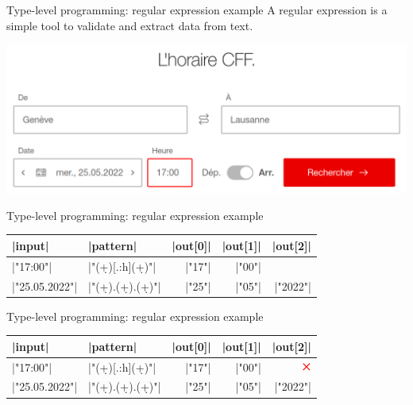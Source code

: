 \documentclass[10pt]{beamer}
\newenvironment{slide}[2][]
  {\begin{frame}[fragile,environment=slide,#1]{#2}}
  {\end{frame}}
\def\cross{$\mathbin{\tikz [x=1.4ex,y=1.4ex,line width=.2ex, red] \draw (0,0) -- (1,1) (0,1) -- (1,0);}$}
\begin{document}
\begin{slide}{Type-level programming: regular expression example}
\Large
A regular expression is a simple tool to validate and extract data from text.
\vspace{10pt}

\includegraphics[width=\textwidth]{figures/cff.png}
\end{slide}

\begin{slide}{Type-level programming: regular expression example}
\begin{center}
\renewcommand{\arraystretch}{1.2}
\begin{tabular}{@{}llrrr@{}}
\toprule
|input| & |pattern| & |out[0]| & |out[1]| & |out[2]| \\
\midrule
|"17:00"| & |"(\d+)[.:h](\d+)"| & |"17"| & |"00"|  & \\
\pause
|"25.05.2022"| & |"(\d+).(\d+).(\d+)"| & |"25"| & |"05"| & |"2022"| \\
\bottomrule
\end{tabular}

\end{center}
\end{slide}

\begin{slide}{Type-level programming: regular expression example}
\begin{center}
\renewcommand{\arraystretch}{1.2}
\begin{tabular}{@{}llrrr@{}}
\toprule
|input| & |pattern| & |out[0]| & |out[1]| & |out[2]| \\
\midrule
|"17:00"| & |"(\d+)[.:h](\d+)"| & |"17"| & |"00"|  & \cross \\
|"25.05.2022"| & |"(\d+).(\d+).(\d+)"| & |"25"| & |"05"| & |"2022"| \\
\bottomrule
\end{tabular}

\end{center}
\end{slide}
\end{document}
